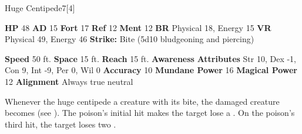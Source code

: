   \begin{monsubsection}{Huge Centipede}{7}[4]
    \vspace{-1em}\vspace{-1em}
    \vspace{0em}

    
    

    \begin{spellcontent}
      \begin{spelltargetinginfo}
        \pari \textbf{HP} 48 \monsep
          \textbf{AD} 15 \monsep
          \textbf{Fort} 17 \monsep
          \textbf{Ref} 12 \monsep
          \textbf{Ment} 12
        \pari \textbf{BR} Physical 18, Energy 15 \monsep
        \textbf{VR} Physical 49, Energy 46
        \pari \textbf{Strike:}
            Bite  (5d10 bludgeoning and piercing)
      \end{spelltargetinginfo}
    \end{spellcontent}
    \begin{monsterfooter}
      \pari \textbf{Speed} 50 ft. \monsep
        \textbf{Space} 15 ft. \monsep
        \textbf{Reach} 15 ft.
      \pari \textbf{Awareness} 
      \pari \textbf{Attributes}
        Str 10, Dex -1,
        Con 9, Int -9,
        Per 0, Wil 0
      \pari \textbf{Accuracy} 10 \monsep
        \textbf{Mundane Power} 16 \monsep
      \textbf{Magical Power} 12
      \pari \textbf{Alignment} Always true neutral
    \end{monsterfooter}
  \end{monsubsection}
        Whenever the huge centipede  a creature with its bite,
          the damaged creature becomes  (see ).
        The poison's initial hit makes the target lose a .
        On the poison's third hit, the target loses two .
  

